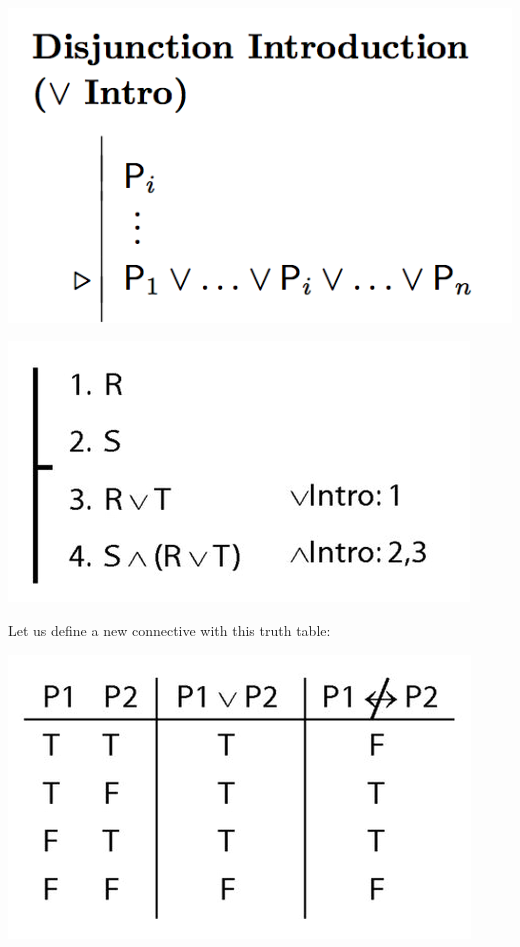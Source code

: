 \documentclass[12pt]{extarticle}
\begin{document}
\begin{multicols*}{3}
\begin{center}
\includegraphics[scale=0.3]{img/rule_disjunction_intro.png}
\end{center}
\begin{center}
\includegraphics[scale=0.3]{img/proof_unit_212}
\end{center}
\begin{minipage}{\columnwidth}
 
Let us define a new connective with this truth table:
 
\begin{center}
\includegraphics[scale=0.3]{img/tt_not_equivalent.png}
\end{center}
\end{minipage}
 

\end{multicols*}
\end{document}
